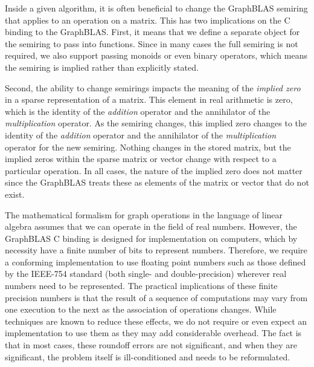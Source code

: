 Inside a given algorithm, it is often beneficial to change the GraphBLAS semiring
that applies to an operation on a matrix.  This has two 
implications on the C binding to the GraphBLAS.  First,
it means that we define a separate object for the semiring 
to pass into functions.  Since in many cases the full
semiring is not required, we also support passing monoids or
even binary operators, which means the semiring is implied rather than 
explicitly stated.

Second, the ability to change semirings impacts the meaning of 
the \emph{implied zero} in a sparse representation of a matrix.
This element in real arithmetic is zero, which is the 
identity of the \emph{addition} operator and the annihilator of the
\emph{multiplication} operator.  As the semiring changes, this 
implied zero changes to the identity of 
the \emph{addition} operator and the annihilator of the \emph{multiplication} 
operator for the new semiring. Nothing changes in the stored matrix, but the 
implied zeros within the sparse matrix or vector change with respect to a particular operation. In all cases, 
the nature of the implied zero does not matter since the GraphBLAS treats these as elements of the matrix or vector that do not exist.


The mathematical formalism for graph operations in the language of 
linear algebra assumes that we can operate in the field of real numbers. 
However, the GraphBLAS C binding is designed for implementation on computers, 
which by necessity have a finite number of bits to represent numbers. 
Therefore, we require a conforming implementation to use floating point 
numbers such as those defined by the IEEE-754 standard (both single- and double-precision) 
wherever real numbers need to be represented. The practical implications of 
these finite precision numbers is that the result of a sequence of 
computations may vary from one execution to the next as the association 
of operations changes.  While techniques are known to 
reduce these effects, we do not require or even expect an implementation 
to use them as they may add considerable overhead. The fact is that in most 
cases, these roundoff errors are not significant, and when they are significant, 
the problem itself is ill-conditioned and needs to be reformulated.

